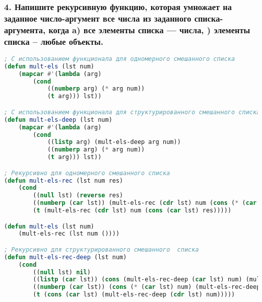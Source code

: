 \subsubsection*{4. Напишите рекурсивную функцию, которая умножает на заданное число-аргумент все числа из заданного списка-аргумента, когда \newline a) все элементы списка --- числа, ) элементы списка -- любые объекты.}
\begin{lstlisting}[language=Lisp]
; С использованием функционала для одномерного смешанного списка
(defun mult-els (lst num)
	(mapcar #'(lambda (arg) 
		(cond 
			((numberp arg) (* arg num))
			(t arg))) lst))

; С использованием функционала для структурированного смешанного списка
(defun mult-els-deep (lst num)
	(mapcar #'(lambda (arg) 
		(cond 
			((listp arg) (mult-els-deep arg num))
			((numberp arg) (* arg num))
			(t arg))) lst))

; Рекурсивно для одномерного смешанного списка
(defun mult-els-rec (lst num res)
	(cond 
		((null lst) (reverse res)
		((numberp (car lst)) (mult-els-rec (cdr lst) num (cons (* (car lst) num) res )))
		(t (mult-els-rec (cdr lst) num (cons (car lst) res)))))

(defun mult-els (lst num)
	(mult-els-rec (lst num ())))

; Рекурсивно для структурированного смешанного  списка 
(defun mult-els-rec-deep (lst num)
	(cond
		((null lst) nil)
		((listp (car lst)) (cons (mult-els-rec-deep (car lst) num) (mult-els-rec-deep (cdr lst) num)))
		((numberp (car lst)) (cons (* (car lst) num) (mult-els-rec-deep (cdr lst) num)))
		(t (cons (car lst) (mult-els-rec-deep (cdr lst) num)))))
\end{lstlisting}

\newpage
